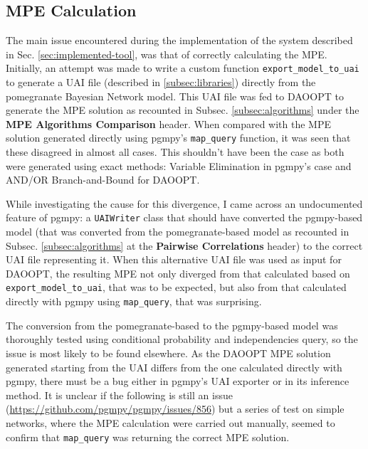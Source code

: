 \subsection{MPE Calculation}
The main issue encountered during the implementation of the system described in Sec. \ref{sec:implemented-tool}, was that of correctly calculating the MPE.
Initially, an attempt was made to write a custom function \texttt{export\_model\_to\_uai} to generate a UAI file (described in \ref{subsec:libraries}) directly from the pomegranate Bayesian Network model.
This UAI file was fed to DAOOPT to generate the MPE solution as recounted in Subsec. \ref{subsec:algorithms} under the \textbf{MPE Algorithms Comparison} header.
When compared with the MPE solution generated directly using pgmpy's \texttt{map\_query} function, it was seen that these disagreed in almost all cases.
This shouldn't have been the case as both were generated using exact methods: Variable Elimination in pgmpy's case and AND/OR Branch-and-Bound for DAOOPT.

While investigating the cause for this divergence, I came across an undocumented feature of pgmpy: a \texttt{UAIWriter} class that should have converted the pgmpy-based model (that was converted from the pomegranate-based model as recounted in Subsec. \ref{subsec:algorithms} at the \textbf{Pairwise Correlations} header) to the correct UAI file representing it.
When this alternative UAI file was used as input for DAOOPT, the resulting MPE not only diverged from that calculated based on \texttt{export\_model\_to\_uai}, that was to be expected, but also from that calculated directly with pgmpy using \texttt{map\_query}, that was surprising.

The conversion from the pomegranate-based to the pgmpy-based model was thoroughly tested using conditional probability and independencies query, so the issue is most likely to be found elsewhere.
As the DAOOPT MPE solution generated starting from the UAI differs from the one calculated directly with pgmpy, there must be a bug either in pgmpy's UAI exporter or in its inference method.
It is unclear if the following is still an issue (\url{https://github.com/pgmpy/pgmpy/issues/856}) but a series of test on simple networks, where the MPE calculation were carried out manually, seemed to confirm that \texttt{map\_query} was returning the correct MPE solution.

